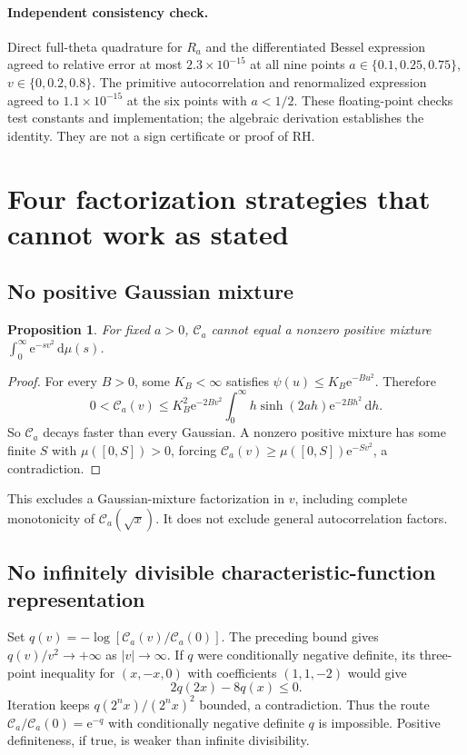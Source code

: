 \documentclass[11pt,letterpaper]{article}
\numberwithin{equation}{section}
\newtheorem{proposition}{Proposition}[section]
\theoremstyle{remark}\newtheorem{remark}[proposition]{Remark}
\newcommand{\dd}{\,\mathrm d}
\newcommand{\calC}{\mathcal C}
\newcommand{\ee}{\mathrm e}
\begin{document}
\paragraph{Independent consistency check.}
Direct full-theta quadrature for $R_a$ and the differentiated Bessel expression agreed to relative error at most $2.3\times10^{-15}$ at all nine points
$a\in\{0.1,0.25,0.75\}$, $v\in\{0,0.2,0.8\}$. The primitive autocorrelation and renormalized expression agreed to $1.1\times10^{-15}$ at the six points with $a<1/2$. These floating-point checks test constants and implementation; the algebraic derivation establishes the identity. They are not a sign certificate or proof of RH.

\section{Four factorization strategies that cannot work as stated}
\subsection{No positive Gaussian mixture}
\begin{proposition}
For fixed $a>0$, $\calC_a$ cannot equal a nonzero positive mixture
$\int_0^\infty\ee^{-sv^2}\dd\mu(s)$.
\end{proposition}
\begin{proof}
For every $B>0$, some $K_B<\infty$ satisfies
$\psi(u)\le K_B\ee^{-Bu^2}$. Therefore
\[
 0<\calC_a(v)\le
 K_B^2\ee^{-2Bv^2}
 \int_0^\infty h\sinh(2ah)\ee^{-2Bh^2}\dd h.
\]
So $\calC_a$ decays faster than every Gaussian. A nonzero positive mixture has some finite $S$ with $\mu([0,S])>0$, forcing
$\calC_a(v)\ge\mu([0,S])\ee^{-Sv^2}$, a contradiction.
\end{proof}
This excludes a Gaussian-mixture factorization in $v$, including complete monotonicity of $\calC_a(\sqrt{x})$. It does not exclude general autocorrelation factors.

\subsection{No infinitely divisible characteristic-function representation}
Set $q(v)=-\log[\calC_a(v)/\calC_a(0)]$. The preceding bound gives
$q(v)/v^2\to+\infty$ as $|v|\to\infty$. If $q$ were conditionally negative definite, its three-point inequality for $(x,-x,0)$ with coefficients $(1,1,-2)$ would give
\[
 2q(2x)-8q(x)\le0.
\]
Iteration keeps $q(2^nx)/(2^nx)^2$ bounded, a contradiction. Thus the route
$\calC_a/\calC_a(0)=\ee^{-q}$ with conditionally negative definite $q$ is impossible. Positive definiteness, if true, is weaker than infinite divisibility.
\end{document}
